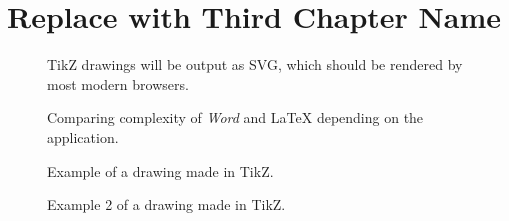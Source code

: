 \chapter{Replace with Third Chapter Name} \label{c3_thirdchapter:cha}

\begin{figure}
    \centering
    \caption{TikZ drawings will be output as SVG, which should be rendered by most modern browsers.}
\end{figure}

\begin{figure}
    \centering
    
    \caption{Comparing complexity of \textit{Word} and \LaTeX{} depending on the application.} \label{fig:latexeffortcomplexity}
\end{figure}

\begin{figure}
    \centering
    

    \caption{Example of a drawing made in TikZ.} \label{fig:leaves-golden-cut}
\end{figure}

\begin{figure}
    \centering
    

    \caption{Example 2 of a drawing made in TikZ.} \label{fig:buildchain}
\end{figure}


